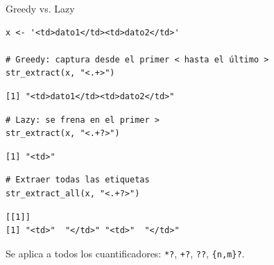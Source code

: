 \documentclass[8pt]{beamer}
\begin{document}
\begin{frame}[fragile]{Greedy vs. Lazy}
\begin{lstlisting}[style=RScript]
x <- '<td>dato1</td><td>dato2</td>'

# Greedy: captura desde el primer < hasta el último >
str_extract(x, "<.+>")
\end{lstlisting}
\begin{lstlisting}[style=RConsole]
[1] "<td>dato1</td><td>dato2</td>"
\end{lstlisting}

\begin{lstlisting}[style=RScript]
# Lazy: se frena en el primer >
str_extract(x, "<.+?>")
\end{lstlisting}
\begin{lstlisting}[style=RConsole]
[1] "<td>"
\end{lstlisting}
\begin{lstlisting}[style=RScript]
# Extraer todas las etiquetas
str_extract_all(x, "<.+?>")
\end{lstlisting}
\begin{lstlisting}[style=RConsole]
[[1]]
[1] "<td>"  "</td>" "<td>"  "</td>"
\end{lstlisting}

	Se aplica a todos los cuantificadores: \verb|*?|, \verb|+?|, \verb|??|, \verb|{n,m}?|.
\end{frame}
\end{document}
